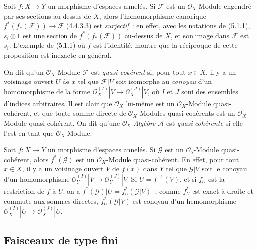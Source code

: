 \begin{env}[5.1.2]
\label{0.5.1.2-fr}
Soit $f:X\to Y$ un morphisme d'espaces annelés. Si $\mathcal{F}$ est un
$\mathcal{O}_X$-Module engendré par ses sections au-dessus de $X$, alors
l'homomorphisme canonique
$f^*(f_*(\mathcal{F}))\to\mathcal{F}$ (4.4.3.3) est \emph{surjectif}~: en
effet, avec les notations de (5.1.1), $s_i\otimes1$ est une section de
$f^*(f_*(\mathcal{F}))$ au-dessus de $X$, et son image dans $\mathcal{F}$ est
$s_i$. L'exemple de (5.1.1) où $f$ est l'identité, montre que la réciproque de
cette proposition est inexacte en général.
\end{env}

\begin{env}[5.1.3]
\label{0.5.1.3-fr}
On dit qu'un $\mathcal{O}_X$-Module $\mathcal{F}$ est \emph{quasi-cohérent}
si, pour tout $x\in X$, il y a un voisinage ouvert $U$ de $x$ tel que
$\mathcal{F}|V$ soit isomorphe au \emph{conoyau} d'un homomorphisme de la
forme
$\mathcal{O}_X^{(I)}|V\to\mathcal{O}_X^{(J)}|V$, où $I$ et $J$ sont des
ensembles d'indices arbitraires. Il est clair que $\mathcal{O}_X$ lui-même est
un $\mathcal{O}_X$-Module quasi-cohérent, et que toute somme directe de
$\mathcal{O}_X$-Modules quasi-cohérents est un $\mathcal{O}_X$-Module
quasi-cohérent. On dit qu'une $\mathcal{O}_X$-\emph{Algèbre} $\mathcal{A}$ est
\emph{quasi-cohérente} si elle l'est en tant que $\mathcal{O}_X$-Module.
\end{env}

\begin{env}[5.1.4]
\label{0.5.1.4-fr}
Soit $f:X\to Y$ un morphisme d'espaces annelés. Si $\mathcal{G}$ est un
$\mathcal{O}_Y$-Module quasi-cohérent, alors $f^*(\mathcal{G})$ est un
$\mathcal{O}_X$-Module quasi-cohérent. En effet, pour tout $x\in X$, il y a
un voisinage ouvert $V$ de $f(x)$ dans $Y$ tel que $\mathcal{G}|V$ soit le
conoyau d'un homomorphisme
$\mathcal{O}_Y^{(I)}|V\to\mathcal{O}_Y^{(J)}|V$. Si $U=f^{-1}(V)$, et si
$f_U$ est la restriction de $f$ à $U$, on a
$f^*(\mathcal{G})|U=f_U^*(\mathcal{G}|V)$~; comme $f_U^*$ est exact à droite
et commute aux sommes directes, $f_U^*(\mathcal{G}|V)$ est conoyau d'un
homomorphisme
$\mathcal{O}_X^{(I)}|U\to\mathcal{O}_X^{(J)}|U$.
\end{env}

\subsection{Faisceaux de type fini}
\label{subsection:0.5.2-fr}

